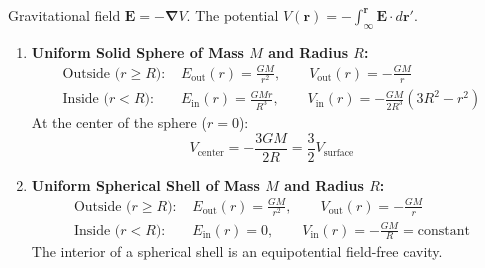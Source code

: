 \documentclass[10pt,a4paper]{article}
\begin{document}
\begin{formulabox}
Gravitational field $\mathbf{E} = -\boldsymbol{\nabla}V$. The potential $V(\mathbf{r}) = -\int_\infty^{\mathbf{r}} \mathbf{E}\cdot d\mathbf{r}'$.
\begin{enumerate}[leftmargin=*]
  \item \textbf{Uniform Solid Sphere of Mass $M$ and Radius $R$:}
  \begin{align}
    \text{Outside ($r \ge R$): } &E_{\text{out}}(r) = \frac{GM}{r^2}, \qquad V_{\text{out}}(r) = -\frac{GM}{r} \\
    \text{Inside ($r < R$): } &E_{\text{in}}(r) = \frac{GM r}{R^3}, \qquad V_{\text{in}}(r) = -\frac{GM}{2R^3}\left(3R^2 - r^2\right)
  \end{align}
  At the center of the sphere ($r = 0$):
  \begin{equation}
    V_{\text{center}} = -\frac{3GM}{2R} = \frac{3}{2}V_{\text{surface}}
  \end{equation}
  \item \textbf{Uniform Spherical Shell of Mass $M$ and Radius $R$:}
  \begin{align}
    \text{Outside ($r \ge R$): } &E_{\text{out}}(r) = \frac{GM}{r^2}, \qquad V_{\text{out}}(r) = -\frac{GM}{r} \\
    \text{Inside ($r < R$): } &E_{\text{in}}(r) = 0, \qquad V_{\text{in}}(r) = -\frac{GM}{R} = \text{constant}
  \end{align}
  The interior of a spherical shell is an equipotential field-free cavity.
\end{enumerate}
\end{formulabox}
\end{document}
